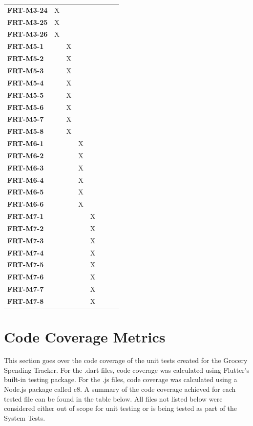 \documentclass[12pt, titlepage]{article}
\begin{document}
\begin{longtable}{|l|cccccc|}
  \textbf{FRT-M3-24} & X & ~ & ~ & ~ & ~ & ~ \\
  \textbf{FRT-M3-25} & X & ~ & ~ & ~ & ~ & ~ \\
  \textbf{FRT-M3-26} & X & ~ & ~ & ~ & ~ & ~ \\
  \textbf{FRT-M5-1} & ~ & X & ~ & ~ & ~ & ~ \\
  \textbf{FRT-M5-2} & ~ & X & ~ & ~ & ~ & ~ \\
  \textbf{FRT-M5-3} & ~ & X & ~ & ~ & ~ & ~ \\
  \textbf{FRT-M5-4} & ~ & X & ~ & ~ & ~ & ~ \\
  \textbf{FRT-M5-5} & ~ & X & ~ & ~ & ~ & ~ \\
  \textbf{FRT-M5-6} & ~ & X & ~ & ~ & ~ & ~ \\
  \textbf{FRT-M5-7} & ~ & X & ~ & ~ & ~ & ~ \\
  \textbf{FRT-M5-8} & ~ & X & ~ & ~ & ~ & ~ \\
  \textbf{FRT-M6-1} & ~ & ~ & X & ~ & ~ & ~ \\
  \textbf{FRT-M6-2} & ~ & ~ & X & ~ & ~ & ~ \\
  \textbf{FRT-M6-3} & ~ & ~ & X & ~ & ~ & ~ \\
  \textbf{FRT-M6-4} & ~ & ~ & X & ~ & ~ & ~ \\
  \textbf{FRT-M6-5} & ~ & ~ & X & ~ & ~ & ~ \\
  \textbf{FRT-M6-6} & ~ & ~ & X & ~ & ~ & ~ \\
  \textbf{FRT-M7-1} & ~ & ~ & ~ & X & ~ & ~ \\
  \textbf{FRT-M7-2} & ~ & ~ & ~ & X & ~ & ~ \\
  \textbf{FRT-M7-3} & ~ & ~ & ~ & X & ~ & ~ \\
  \textbf{FRT-M7-4} & ~ & ~ & ~ & X & ~ & ~ \\
  \textbf{FRT-M7-5} & ~ & ~ & ~ & X & ~ & ~ \\
  \textbf{FRT-M7-6} & ~ & ~ & ~ & X & ~ & ~ \\
  \textbf{FRT-M7-7} & ~ & ~ & ~ & X & ~ & ~ \\
  \textbf{FRT-M7-8} & ~ & ~ & ~ & X & ~ & ~ \\
  \hline
\end{longtable}

\section{Code Coverage Metrics}

This section goes over the code coverage of the unit tests created for the Grocery Spending Tracker.
For the .dart files, code coverage was calculated using Flutter's built-in testing package. For the .js files,
code coverage was calculated using a Node.js package called c8. A summary of the code coverage achieved for
each tested file can be found in the table below. All files not listed below were considered either out of scope for
unit testing or is being tested as part of the System Tests.
\end{document}
